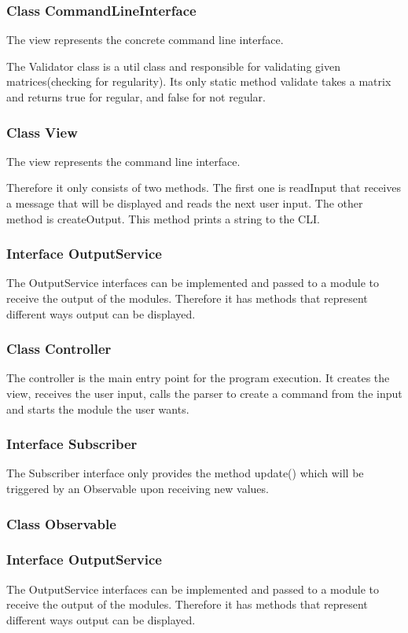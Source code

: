 \documentclass[parskip=full]{scrartcl}
\begin{document}
\subsubsection{Class CommandLineInterface}
The view represents the concrete command line interface. 

The Validator class is a util class and responsible for validating given matrices(checking for regularity).
Its only static method validate takes a matrix and returns true for regular, and false for not regular.

\subsubsection{Class View}
The view represents the command line interface. 

Therefore it only consists of two methods. 
The first one is readInput that receives a message that will be displayed and reads the next user input. 
The other method is createOutput. 
This method prints a string to the CLI.


\subsubsection{Interface OutputService}
The OutputService interfaces can be implemented and passed to a module to receive the output of the modules. 
Therefore it has methods that represent different ways output can be displayed. 

\subsubsection{Class Controller} 
The controller is the main entry point for the program execution. 
It creates the view, receives the user input, calls the parser to create a command from the input and starts the module the user wants.


 \subsubsection{Interface Subscriber}
The Subscriber interface only provides the method update() which will be triggered by an Observable upon receiving new values.

\subsubsection{Class Observable} 

\subsubsection{Interface OutputService}
The OutputService interfaces can be implemented and passed to a module to receive the output of the modules. 
Therefore it has methods that represent different ways output can be displayed. 
\end{document}
